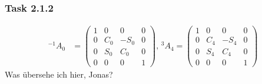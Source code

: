 \subsubsection*{Task 2.1.2}
\begin{align*}
^{-1}A_0 &= 
\begin{pmatrix}
1 & 0 & 0 & 0 \\
0 & C_0 & -S_0 & 0 \\
0 & S_0 & C_0 & 0 \\
0 & 0 & 0 & 1 
\end{pmatrix},
\,^{3}A_4 =
\begin{pmatrix}
1 & 0 & 0 & 0 \\
0 & C_4 & -S_4 & 0 \\
0 & S_4 & C_4 & 0 \\
0 & 0 & 0 & 1 
\end{pmatrix}
\end{align*}
Was übersehe ich hier, Jonas?
